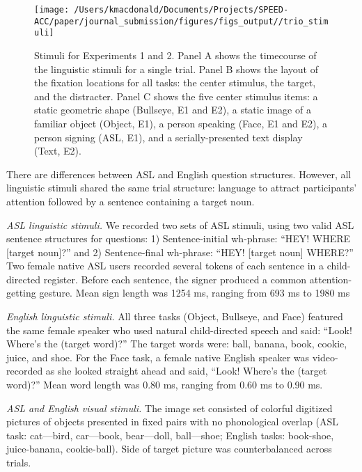 \documentclass[english,floatsintext,man]{apa6}
\begin{document}
\begin{figure}[!t]

{\centering \texttt{[image: /Users/kmacdonald/Documents/Projects/SPEED-ACC/paper/journal\_submission/figures/figs\_output//trio\_stimuli]} 

}

\caption{Stimuli for Experiments 1 and 2. Panel A shows the timecourse of the linguistic stimuli for a single trial. Panel B shows the layout of the fixation locations for all tasks: the center stimulus, the target, and the distracter. Panel C shows the five center stimulus items: a static geometric shape (Bullseye, E1 and E2), a static image of a familiar object (Object, E1), a person speaking (Face, E1 and E2), a person signing (ASL, E1), and a serially-presented text display (Text, E2).}\label{fig:trio-stim}
\end{figure}

There are differences between ASL and English question structures.
However, all linguistic stimuli shared the same trial structure:
language to attract participants' attention followed by a sentence
containing a target noun.

\emph{ASL linguistic stimuli.} We recorded two sets of ASL stimuli,
using two valid ASL sentence structures for questions: 1)
Sentence-initial wh-phrase: \enquote{HEY! WHERE {[}target noun{]}?} and
2) Sentence-final wh-phrase: \enquote{HEY! {[}target noun{]} WHERE?} Two
female native ASL users recorded several tokens of each sentence in a
child-directed register. Before each sentence, the signer produced a
common attention-getting gesture. Mean sign length was 1254 ms, ranging
from 693 ms to 1980 ms

\emph{English linguistic stimuli.} All three tasks (Object, Bullseye,
and Face) featured the same female speaker who used natural
child-directed speech and said: \enquote{Look! Where's the (target
word)?} The target words were: ball, banana, book, cookie, juice, and
shoe. For the Face task, a female native English speaker was
video-recorded as she looked straight ahead and said, \enquote{Look!
Where's the (target word)?} Mean word length was 0.80 ms, ranging from
0.60 ms to 0.90 ms.

\emph{ASL and English visual stimuli.} The image set consisted of
colorful digitized pictures of objects presented in fixed pairs with no
phonological overlap (ASL task: cat---bird, car---book, bear---doll,
ball---shoe; English tasks: book-shoe, juice-banana, cookie-ball). Side
of target picture was counterbalanced across trials.
\end{document}

